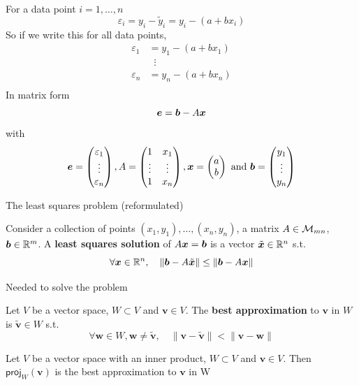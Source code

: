 \documentclass[aspectratio=169]{beamer}\usepackage[]{graphicx}\usepackage[]{xcolor}
\begin{document}
\begin{frame}
	For a data point $i=1,\ldots,n$
	\[
	\varepsilon_i = y_i-\tilde y_i = y_i - (a+bx_i)
	\]
	So if we write this for all data points,
	\begin{align*}
	\varepsilon_1 &= y_1 - (a+bx_1) \\
	&\;\;\vdots \\
	\varepsilon_n &= y_n - (a+bx_n) \\
	\end{align*}
	In matrix form
	\[
	\bm{e} = \bm{b}-A\bm{x}
	\]
	with
	\[
	\bm{e} = \begin{pmatrix}
	\varepsilon_1\\ \vdots\\ \varepsilon_n
	\end{pmatrix},
	A=\begin{pmatrix}
	1 & x_1 \\ \vdots & \vdots \\ 1 & x_n
	\end{pmatrix},
	\bm{x} = \begin{pmatrix}
	a\\b
	\end{pmatrix}\textrm{ and }
	\bm{b} = \begin{pmatrix}
	y_1\\ \vdots\\ y_n
	\end{pmatrix}
	\]
\end{frame}

\begin{frame}{The least squares problem (reformulated)}
\begin{importantdefinition}
Consider a collection of points $(x_1,y_1),\ldots,(x_n,y_n)$, a matrix $A\in\mathcal{M}_{mn}$, $\bm{b}\in\mathbb{R}^m$. A \textbf{least squares solution} of $A\bm{x}=\bm{b}$ is a vector $\tilde {\bm{x}}\in\mathbb{R}^n$ s.t.
\[
\forall \bm{x}\in\mathbb{R}^n,\quad \|\bm{b}-A\tilde{\bm{x}}\|\leq \|\bm{b}-A\bm{x}\|
\]
\end{importantdefinition}
\end{frame}


\begin{frame}{Needed to solve the problem}
\begin{definition}
Let $V$ be a vector space, $W\subset V$ and $\mathbf{v}\in V$. The \textbf{best approximation} to $\mathbf{v}$ in $W$ is $\tilde{\mathbf{v}}\in W$ s.t.
\[
\forall\mathbf{w}\in W, \mathbf{w}\neq\tilde{\mathbf{v}}, \quad
\|\mathbf{v}-\tilde{\mathbf{v}}\| < \|\mathbf{v}-\mathbf{w}\|
\]
\end{definition}
\vfill
\begin{theorem}
Let $V$ be a vector space with an inner product, $W\subset V$ and $\mathbf{v}\in V$. Then $\mathsf{proj}_W(\mathbf{v})$ is the best approximation to $\mathbf{v}$ in W
\end{theorem}
\end{frame}
\end{document}
